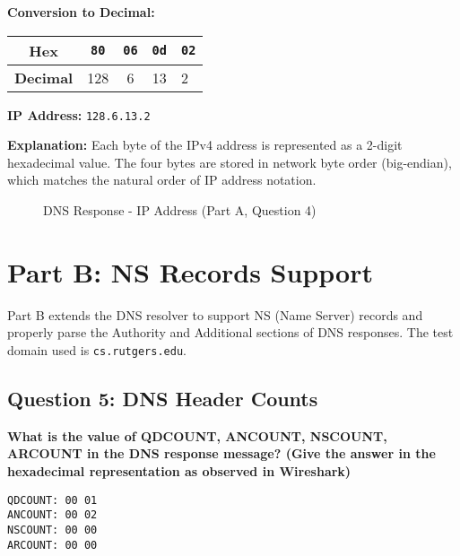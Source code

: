 \documentclass[11pt,letterpaper]{article}
\begin{document}
\textbf{Conversion to Decimal:}
\begin{center}
\begin{tabular}{cccc}
\toprule
\textbf{Hex} & \texttt{80} & \texttt{06} & \texttt{0d} & \texttt{02} \\
\midrule
\textbf{Decimal} & 128 & 6 & 13 & 2 \\
\bottomrule
\end{tabular}
\end{center}

\textbf{IP Address:} \texttt{128.6.13.2}

\textbf{Explanation:} Each byte of the IPv4 address is represented as a 2-digit hexadecimal value. The four bytes are stored in network byte order (big-endian), which matches the natural order of IP address notation.

\begin{figure}[h]
    \centering
    \caption{DNS Response - IP Address (Part A, Question 4)}
    \label{fig:parta_q4}
\end{figure}

\newpage

\section{Part B: NS Records Support}

Part B extends the DNS resolver to support NS (Name Server) records and properly parse the Authority and Additional sections of DNS responses. The test domain used is \texttt{cs.rutgers.edu}.

\subsection{Question 5: DNS Header Counts}

\textbf{What is the value of QDCOUNT, ANCOUNT, NSCOUNT, ARCOUNT in the DNS response message? (Give the answer in the hexadecimal representation as observed in Wireshark)}

\begin{hexbox}
\begin{lstlisting}[style=hexstyle]
QDCOUNT: 00 01
ANCOUNT: 00 02
NSCOUNT: 00 00
ARCOUNT: 00 00
\end{lstlisting}
\end{hexbox}
\end{document}

